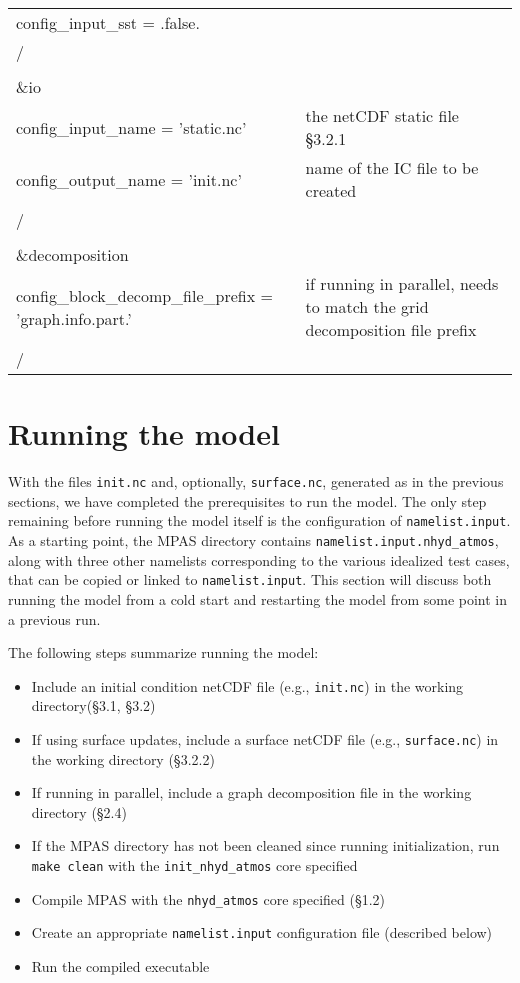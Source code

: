 \begin{longtable}{p{3.0in} |p{3.25in}}
   config\_input\_sst       = .false.                & \\
/\\
\\
\&io\\
   config\_input\_name         = 'static.nc'         & the netCDF static file \S 3.2.1 \\
   config\_output\_name        = 'init.nc'           & name of the IC file to be created \\
/\\
\\
\&decomposition\\
   config\_block\_decomp\_file\_prefix = 'graph.info.part.' & if running in parallel, needs to match the grid decomposition file prefix \\
/\\
\end{longtable}


\section{Running the model}

With the files {\tt init.nc} and, optionally, {\tt surface.nc}, generated as in the previous sections, we have completed the prerequisites to run the model.  The only step remaining before running the model itself is the configuration of {\tt namelist.input}.  As a starting point, the MPAS directory contains {\tt namelist.input.nhyd\_atmos}, along with three other namelists corresponding to the various idealized test cases, that can be copied or linked to {\tt namelist.input}.  This section will discuss both running the model from a cold start and restarting the model from some point in a previous run.

The following steps summarize running the model:

\begin{itemize}
\item Include an initial condition netCDF file (e.g., {\tt init.nc}) in the working directory(\S 3.1, \S 3.2)
\item If using surface updates, include a surface netCDF file (e.g., {\tt surface.nc}) in the working directory (\S 3.2.2)
\item If running in parallel, include a graph decomposition file in the working directory (\S 2.4)
\item If the MPAS directory has not been cleaned since running initialization, run {\tt make clean} with the {\tt init\_nhyd\_atmos} core specified
\item Compile MPAS with the {\tt nhyd\_atmos} core specified (\S 1.2)
\item Create an appropriate {\tt namelist.input} configuration file (described below)
\item Run the compiled executable
\end{itemize}

